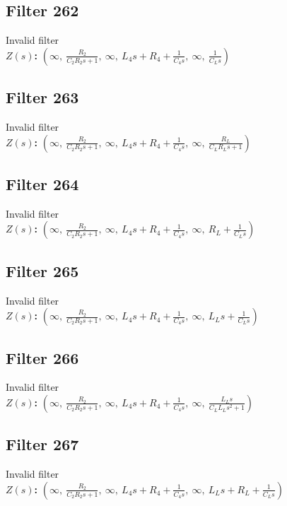 \documentclass{article}
\begin{document}
\subsection*{Filter 262}
Invalid filter \\ 
\textbf{$Z(s)$:} $\left( \infty, \  \frac{R_{2}}{C_{2} R_{2} s + 1}, \  \infty, \  L_{4} s + R_{4} + \frac{1}{C_{4} s}, \  \infty, \  \frac{1}{C_{L} s}\right)$ \\ 
\subsection*{Filter 263}
Invalid filter \\ 
\textbf{$Z(s)$:} $\left( \infty, \  \frac{R_{2}}{C_{2} R_{2} s + 1}, \  \infty, \  L_{4} s + R_{4} + \frac{1}{C_{4} s}, \  \infty, \  \frac{R_{L}}{C_{L} R_{L} s + 1}\right)$ \\ 
\subsection*{Filter 264}
Invalid filter \\ 
\textbf{$Z(s)$:} $\left( \infty, \  \frac{R_{2}}{C_{2} R_{2} s + 1}, \  \infty, \  L_{4} s + R_{4} + \frac{1}{C_{4} s}, \  \infty, \  R_{L} + \frac{1}{C_{L} s}\right)$ \\ 
\subsection*{Filter 265}
Invalid filter \\ 
\textbf{$Z(s)$:} $\left( \infty, \  \frac{R_{2}}{C_{2} R_{2} s + 1}, \  \infty, \  L_{4} s + R_{4} + \frac{1}{C_{4} s}, \  \infty, \  L_{L} s + \frac{1}{C_{L} s}\right)$ \\ 
\subsection*{Filter 266}
Invalid filter \\ 
\textbf{$Z(s)$:} $\left( \infty, \  \frac{R_{2}}{C_{2} R_{2} s + 1}, \  \infty, \  L_{4} s + R_{4} + \frac{1}{C_{4} s}, \  \infty, \  \frac{L_{L} s}{C_{L} L_{L} s^{2} + 1}\right)$ \\ 
\subsection*{Filter 267}
Invalid filter \\ 
\textbf{$Z(s)$:} $\left( \infty, \  \frac{R_{2}}{C_{2} R_{2} s + 1}, \  \infty, \  L_{4} s + R_{4} + \frac{1}{C_{4} s}, \  \infty, \  L_{L} s + R_{L} + \frac{1}{C_{L} s}\right)$ \\ 
\end{document}
